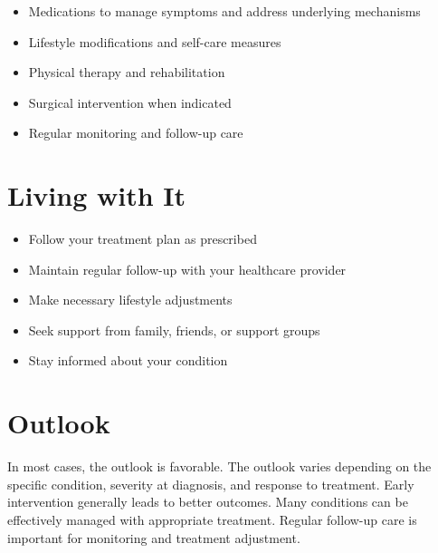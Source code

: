 \begin{itemize}[noitemsep]
  \item Medications to manage symptoms and address underlying mechanisms
  \item Lifestyle modifications and self-care measures
  \item Physical therapy and rehabilitation
  \item Surgical intervention when indicated
  \item Regular monitoring and follow-up care
\end{itemize}
\section{Living with It}
\begin{itemize}[noitemsep]
  \item Follow your treatment plan as prescribed
  \item Maintain regular follow-up with your healthcare provider
  \item Make necessary lifestyle adjustments
  \item Seek support from family, friends, or support groups
  \item Stay informed about your condition
\end{itemize}
\section{Outlook}
In most cases, the outlook is favorable. The outlook varies depending on the specific condition, severity at diagnosis, and response to treatment. Early intervention generally leads to better outcomes. Many conditions can be effectively managed with appropriate treatment. Regular follow-up care is important for monitoring and treatment adjustment.
